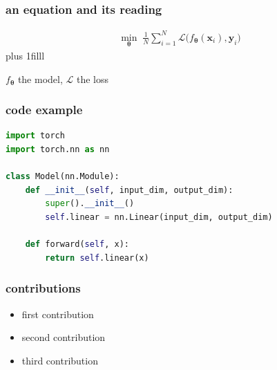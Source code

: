 \documentclass[aspectratio=169, 14pt]{beamer}
\newcommand{\B}{\mathbf}
\newcommand{\Bs}{\boldsymbol}
\newcommand{\readinggap}{2.2em}
\newcommand{\eqlift}{\vspace{-0.4em}}
\newcommand{\reading}[1]{\vskip 0pt plus 1filll\centerline{\large \color{Gray} #1}\vspace{\readinggap}}
\begin{document}
\begin{frame}[t]

    \frametitle{an equation and its reading}

    \eqlift
    {\large
    \begin{align*}
        \min_{\Bs{\theta}}\; \frac{1}{N}\sum_{i=1}^{N}\mathcal{L}\big(f_{\Bs{\theta}}(\B{x}_i),\B{y}_i\big)
    \end{align*}
    }
    \reading{$f_{\Bs{\theta}}$ the model, $\mathcal{L}$ the loss}

\end{frame}


\begin{frame}[fragile]

    \frametitle{code example}

    \vspace{-0.5em}

\begin{lstlisting}[language=Python]
import torch
import torch.nn as nn

class Model(nn.Module):
    def __init__(self, input_dim, output_dim):
        super().__init__()
        self.linear = nn.Linear(input_dim, output_dim)

    def forward(self, x):
        return self.linear(x)
\end{lstlisting}

\end{frame}


\begin{frame}

    \frametitle{contributions}

    \vspace{-1em}

    \begin{itemize}
        \setlength{\itemindent}{-1em}
        \setlength\itemsep{1.5em}
        \item first contribution
        \item second contribution
        \item third contribution
    \end{itemize}

\end{frame}
\end{document}
